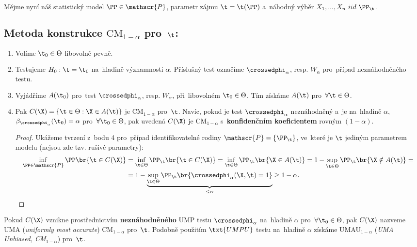 Mějme  nyní náš statistický model $\PP\in\mathscr{P}$, parametr zájmu $\t=\t(\PP)$ a~náhodný výběr $X_1,...,X_n~iid~\PP_{\t}$.
\subsection*{Metoda konstrukce $\mathrm{CM}_{1-\alpha}$ pro~$\t$:}
\begin{enumerate}[1.]
	\item Volíme $\t_0\in\Theta$ libovolně pevně.
	\item Testujeme $H_0:\t=\t_0$ na~hladině významnosti $\alpha$. Příslušný test označíme $\crossedphi_\alpha$, resp. $W_\alpha$ pro~případ neznáhodněného testu.
	\item Vyjádříme $A(\t_0)$ pro~test $\crossedphi_\alpha$, resp. $W_\alpha$, při~libovolném $\t_0\in\Theta$. Tím získáme $A(\t)$ pro~$\forall\t\in\Theta$.
	\item Pak $C(\X)=\left\{ \t\in\Theta:\X\in A(\t) \right\}$ je $\mathrm{CM}_{1-\alpha}$ pro~$\t$. Navíc, pokud je test $\crossedphi_\alpha$ neznáhodněný a~je na~hladině $\alpha$, $\beta_{\crossedphi_\alpha}(\t_0)=\alpha$ pro~$\forall\t_0\in\Theta$, pak uvedená $C(\X)$ je $\mathrm{CM}_{1-\alpha}$ s~\textbf{konfidenčním koeficientem} rovným $(1-\alpha)$.
	\begin{proof}
		Ukážeme tvrzení z~bodu 4 pro~případ identifikovatelné rodiny $\mathscr{P}=\{\PP_\t\}$, ve~které je $\t$ jediným parametrem modelu (nejsou zde tzv. rušivé parametry):\[
		\begin{split}
		\inf\limits_{\PP\in\mathscr{P}}\PP\br{\t\in C(\X)}&=\inf\limits_{\t\in\Theta} \PP_{\t}\br{\t\in C(\X)}=\inf\limits_{\t\in\Theta} \PP_\t\br{\X\in A(\t)}=1-\sup\limits_{\t\in\Theta} \PP_\t\br{\X\notin A(\t)}=\\&=1-\underbrace{\sup\limits_{\t\in\Theta} \PP_\t\br{\crossedphi_\alpha(\X,\t)=1}}_{\leq\alpha}\geq 1-\alpha.
		\end{split}
		\]
	\end{proof}
\end{enumerate}
\begin{remark}
	Pokud $C(\X)$ vznikne prostřednictvím \textbf{neznáhodněného} UMP testu $\crossedphi_\alpha$ na~hladině $\alpha$ pro~$\forall\t_0\in\Theta$, pak $C(\X)$ nazveme UMA (\textit{uniformly most accurate}) $\mathrm{CM}_{1-\alpha}$ pro~$\t$. Podobně použitím $\txt{UMPU}$ testu na~hladině $\alpha$ získáme UMAU$_{1-\alpha}$ (\textit{UMA Unbiased, CM$_{1-\alpha}$}) pro~$\t$.
\end{remark}
